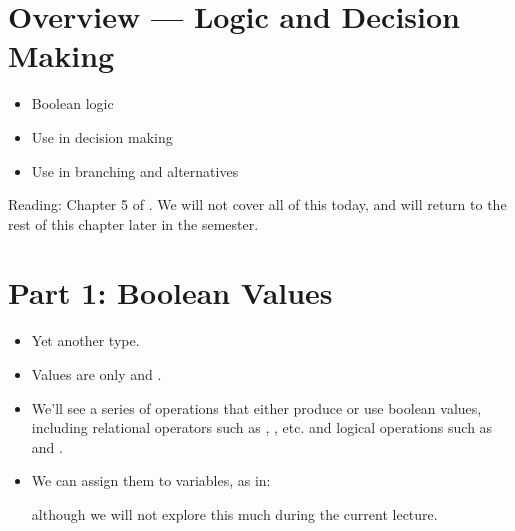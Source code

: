 \documentclass[letterpaper,10pt,english]{sphinxmanual}
\begin{document}
\section{Overview — Logic and Decision Making}
\label{\detokenize{lecture_notes/lec06_conditionals1:overview-logic-and-decision-making}}\begin{itemize}
\item {} 
Boolean logic

\item {} 
Use in decision making

\item {} 
Use in branching and alternatives

\end{itemize}

Reading: Chapter 5 of . We will not cover all
of this today, and will return
to the rest of this chapter later in the semester.


\section{Part 1: Boolean Values}
\label{\detokenize{lecture_notes/lec06_conditionals1:part-1-boolean-values}}\begin{itemize}
\item {} 
Yet another type.

\item {} 
Values are only  and .

\item {} 
We’ll see a series of operations that either produce or use
boolean values, including relational operators such as \sphinxcode{\sphinxupquote{\textless{}}}, \sphinxcode{\sphinxupquote{\textless{}=}},
etc. and logical operations such as  and .

\item {} 
We can assign them to variables, as in:

\begin{sphinxVerbatim}[commandchars=\\\{\}]
  
\end{sphinxVerbatim}

although we will not explore this much during the current lecture.

\end{itemize}
\end{document}
